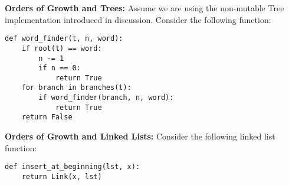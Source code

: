 \documentclass{exam}
\begin{document}
\begin{questions}
\begin{blocksection}
\begin{parts}
\end{parts}
\end{blocksection}

\begin{blocksection}
\question \textbf{Orders of Growth and Trees:} Assume we are using the non-mutable Tree implementation introduced in discussion. Consider the following function:
\begin{lstlisting}
def word_finder(t, n, word):
    if root(t) == word:
        n -= 1
        if n == 0:
            return True
    for branch in branches(t):
        if word_finder(branch, n, word):
            return True
    return False
\end{lstlisting}


\end{blocksection}

\begin{blocksection}
\question \textbf{Orders of Growth and Linked Lists:} Consider the following
linked list function:
\begin{lstlisting}
def insert_at_beginning(lst, x):
    return Link(x, lst)
\end{lstlisting}

\begin{parts}

\end{parts}
\end{blocksection}
\end{questions}
\end{document}
